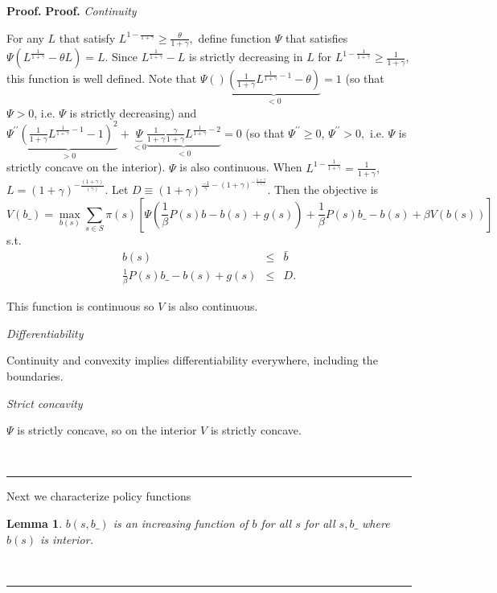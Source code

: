 \documentclass[thmsb,11pt]{article}
\newtheorem{lemma}{Lemma}
\newenvironment{proof}[1][Proof]{\noindent \textbf{#1.} }{\  \rule{0.5em}{0.5em}}
\begin{document}
\begin{proof}
\begin{proof}
\textit{Continuity}

For any $L$ that satisfy $L^{1-\frac{}{1+\gamma} }\geq \frac{\theta }{1+\gamma} ,$ define function $%
\Psi $ that satisfies $\Psi \left( L^{\frac{1}{1+\gamma} }-\theta L\right) =L.$ Since $%
L^{\frac{1}{1+\gamma} }-L$ is strictly decreasing in $L$ for $L^{1-\frac{1}{1+\gamma} }\geq
\frac{1}{1+\gamma} $, this function is well defined. Note that $\Psi \left(
{}\right) \underbrace{\left( \frac{1}{1+\gamma }L^{\frac{1}{1+\gamma} -1}-\theta \right) }%
_{<0}=1$ (so that $\Psi >0$, i.e. $\Psi $ is strictly decreasing)
and $\Psi ^{\prime \prime }\underbrace{\left( \frac{1}{1+\gamma }L^{\frac{1}{1+\gamma}
-1}-1\right) ^{2}}_{>0}+\underbrace{\Psi }_{<0}\underbrace{\frac{1%
}{1+\gamma }\frac{\gamma }{1+\gamma }L^{\frac{1}{1+\gamma} -2}}_{<0}=0$ (so that $\Psi
^{\prime \prime }\geq 0$, $\Psi ^{\prime \prime }>0,$ i.e. $\Psi $ is
strictly concave on the interior). $\Psi $ is also continuous. When $%
L^{1-\frac{1}{1+\gamma} }=\frac{1}{1+\gamma} ,$ $L=(1+\gamma) ^{-\frac{(1+\gamma)} {\left( \gamma \right)} }.$
Let $D\equiv (1+\gamma) ^{\frac{-1}{ \gamma }-(1+\gamma) ^{-\frac{1+\gamma }{\left(\gamma\right)} }}.$ Then the objective is
\[
V\left( b\_\right) =\max_{b\left( s\right) }\sum_{s\in S}\pi \left(
s\right) \left[ \Psi \left( \frac{1}{\beta }P\left( s\right) b-b\left(
s\right) +g\left( s\right) \right) +\frac{1}{\beta }P\left( s\right)
b\_-b\left( s\right) +\beta V\left( b\left( s\right) \right) \right]
\]%
s.t.%
\begin{eqnarray*}
b\left( s\right) &\leq &\bar{b} \\
\frac{1}{\beta }P\left( s\right) b\_-b\left( s\right) +g\left( s\right) &\leq
&D.
\end{eqnarray*}

This function is continuous so $V$ is also continuous.

\textit{Differentiability}

Continuity and convexity implies differentiability everywhere, including the
boundaries.

\textit{Strict concavity}

$\Psi $ is strictly concave, so on the interior $V$ is strictly
concave.

\end{proof}

\smallskip Next we characterize policy functions

\begin{lemma}
\label{lem increasing b}
$b\left( s,b\_\right) $ is an increasing function of $b$ for all $s$ for all $%
s,b\_ $ where $b\left( s\right) $ is interior.
\end{lemma}


\end{proof}
\end{document}
